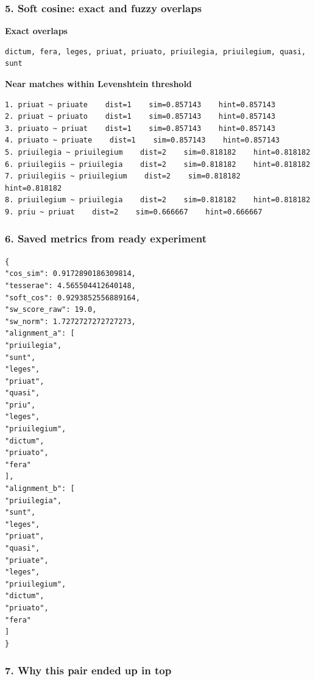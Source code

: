 \subsubsection{5. Soft cosine: exact and fuzzy overlaps}

\textbf{Exact overlaps} 

\begin{lstlisting}[breaklines=true,basicstyle=\ttfamily\small]
dictum, fera, leges, priuat, priuato, priuilegia, priuilegium, quasi, sunt
\end{lstlisting}

\textbf{Near matches within Levenshtein threshold} 

\begin{lstlisting}[breaklines=true,basicstyle=\ttfamily\small]
1. priuat ~ priuate    dist=1    sim=0.857143    hint=0.857143
2. priuat ~ priuato    dist=1    sim=0.857143    hint=0.857143
3. priuato ~ priuat    dist=1    sim=0.857143    hint=0.857143
4. priuato ~ priuate    dist=1    sim=0.857143    hint=0.857143
5. priuilegia ~ priuilegium    dist=2    sim=0.818182    hint=0.818182
6. priuilegiis ~ priuilegia    dist=2    sim=0.818182    hint=0.818182
7. priuilegiis ~ priuilegium    dist=2    sim=0.818182    hint=0.818182
8. priuilegium ~ priuilegia    dist=2    sim=0.818182    hint=0.818182
9. priu ~ priuat    dist=2    sim=0.666667    hint=0.666667
\end{lstlisting}

\subsubsection{6. Saved metrics from ready experiment}

\begin{lstlisting}[breaklines=true,basicstyle=\ttfamily\small,language={}]
{
"cos_sim": 0.9172890186309814,
"tesserae": 4.565504412640148,
"soft_cos": 0.9293852556889164,
"sw_score_raw": 19.0,
"sw_norm": 1.7272727272727273,
"alignment_a": [
"priuilegia",
"sunt",
"leges",
"priuat",
"quasi",
"priu",
"leges",
"priuilegium",
"dictum",
"priuato",
"fera"
],
"alignment_b": [
"priuilegia",
"sunt",
"leges",
"priuat",
"quasi",
"priuate",
"leges",
"priuilegium",
"dictum",
"priuato",
"fera"
]
}
\end{lstlisting}

\subsubsection{7. Why this pair ended up in top}

